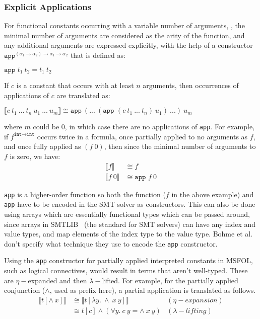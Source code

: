 \documentclass{article}
\begin{document}
	\subsubsection{Explicit Applications}
		For functional constants occurring 
		with a variable number of arguments, 
		\cite{bohme}, the minimal 
		number of arguments are 
		considered as the arity of the 
		function, and any additional 
		arguments are expressed 
		explicitly, with the help of a 
		constructor 
		$\texttt{app}^{(\alpha_1 \to 
		\alpha_2) \to \alpha_1 \to 
		\alpha_2}$ that is defined as:
		\begin{center}
			$\texttt{app }t_1\ t_2 = 
			t_1\ t_2$
		\end{center}
		If $c$ is a constant that 
		occurs with at least $n$
		arguments, then 
		occurrences of applications 
		of $c$ are translated as:
		\begin{center}
			$\llbracket c\ t_1\ ...\ t_n
			\ u_1\ ...\ u_m \rrbracket
			\cong \texttt{app}\ (...\ 
			(\texttt{app }(c\ t_1\ 
			...\ t_n)\ u_1)	\ ...)\ u_m$
		\end{center}
		where $m$ could be $0$, in which 
		case there are no applications 
		of \texttt{app}. For example, if 
		$f^{\texttt{int} \to \texttt{int}}$ 
		occurs twice in a formula, once 
		partially applied to no arguments 
		as $f$, and once fully applied as 
		$(f\ 0)$, then since the minimal 
		number of arguments to $f$ is 
		zero, we have:
		\begin{align*}
		\llbracket f \rrbracket &\cong
		f\\
		\llbracket f\ 0 \rrbracket &\cong
		\texttt{app } f\ 0
		\end{align*}
		
		\texttt{app} is a higher-order 
		function so both the function 
		($f$ in the above example) and 
		\texttt{app} have to be encoded 
		in the SMT solver as constructors.
		This can also be done using arrays 
		which are essentially functional 
		types which can be passed
		around, since arrays in 
		SMTLIB~\cite{BarFT-SMTLIB} (the 
		standard for SMT solvers)
		can have any index and value types, 
		and map elements of the index type 
		to the value type. Bohme et al. 
		don't specify what technique 
		they use to encode the 
		\texttt{app} constructor.
		
		Using the \texttt{app} constructor
		for partially applied interpreted 
		constants in MSFOL, such as 
		logical connectives, would result 
		in terms that aren't well-typed.
		These are $\eta-$expanded and 
		then $\lambda-$lifted. For example, 
		for the partially applied 
		conjunction ($\land$, used as prefix 
		here), a partial application is 
		translated as follows.
		\begin{align*}
			\llbracket t [\land\ x] 
			\rrbracket &\cong \llbracket 
			 t[\lambda y.\ \land\ x\ y]
			\rrbracket&(\eta-expansion)\\
			&\cong t[c]  \land (\forall y.\ 
			c\ y = \land\ x\ y) &(\lambda-lifting)
		\end{align*}
		
\end{document}
